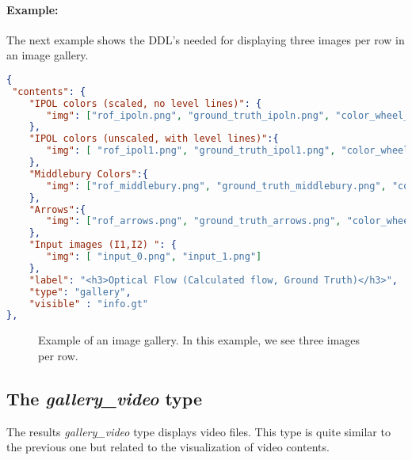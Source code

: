 \paragraph{Example:}
The next example shows the DDL's needed for displaying three images per row in an image gallery.
\begin{lstlisting}[language=json,firstnumber=1]
{
 "contents": {
    "IPOL colors (scaled, no level lines)": {
       "img": ["rof_ipoln.png", "ground_truth_ipoln.png", "color_wheel_ipoln.png"]
    },
    "IPOL colors (unscaled, with level lines)":{
       "img": [ "rof_ipol1.png", "ground_truth_ipol1.png", "color_wheel_ipol1.png"]
    },
    "Middlebury Colors":{
       "img": ["rof_middlebury.png", "ground_truth_middlebury.png", "color_wheel_middlebury.png"]
    },
    "Arrows":{
       "img": ["rof_arrows.png", "ground_truth_arrows.png", "color_wheel_arrows.png"]
    },
    "Input images (I1,I2) ": {
       "img": [ "input_0.png", "input_1.png"]
    },
    "label": "<h3>Optical Flow (Calculated flow, Ground Truth)</h3>", 
    "type": "gallery",
    "visible" : "info.gt"
},
\end{lstlisting}

\begin{figure}[h]
\centering
{}
\caption{Example of an image gallery. In this example, we see three images per row.}
\label{fig:image_gallery_example}
\end{figure}

\subsection{The \emph{gallery\_video} type}

The results \emph{gallery\_video} type displays video files. This type is quite similar to the previous one but related to the visualization of video contents.

